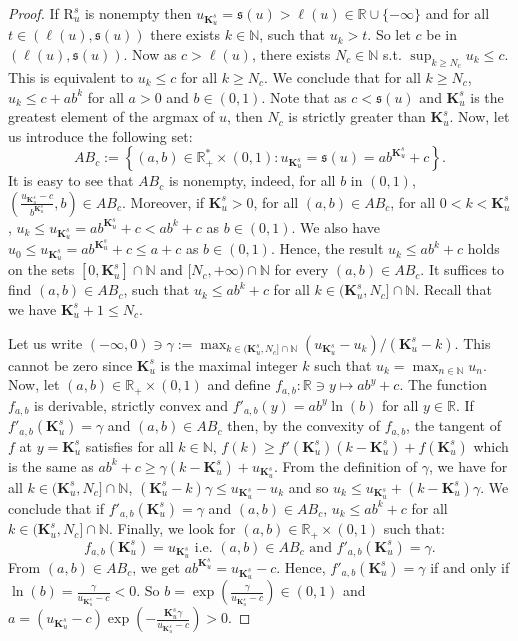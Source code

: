\documentclass{article}
\def\valu#1{\mathfrak{s}(#1)}
\def\ls#1{\boldsymbol{\ell}(#1)}
\def\rr{\mathbb R}
\def\nn{\mathbb N}
\def\bigks{\mathbf{K}^s}
\def\gls#1{{\mathrm R}_{#1}}
\def\gsls#1{\gls{#1}^s}
\def\red#1{#1}
\begin{document}
	\begin{proof}
		If $\gsls{u}$ is nonempty then $u_{\bigks_u}=\valu{u}>\ls{u}\in\rr\cup\{-\infty\}$ and for all $t\in (\ls{u},\valu{u})$ there exists 
		$k\in\nn$, such that $u_k>t$. So let $c$ be in $(\ls{u},\valu{u})$. Now as $c>\ls{u}$, there exists $N_c\in\nn$ s.t. $\sup_{k\geq N_c} u_k\leq c$. This is equivalent to $u_k\leq c$ for all $k\geq N_c$. We conclude that for all $k\geq N_c$, $u_k\leq c+ab^k$ for all $a>0$ and $b\in (0,1)$. Note that as $c<\valu{u}$ and $\bigks_u$ is the greatest element of the argmax of $u$, then $N_c$ is strictly greater than $\bigks_u$. Now, let us introduce the following set: 
		\[
		{AB}_c:= \left\{(a,b)\in\rr_+^* \times (0,1): u_{\bigks_u}=\valu{u}=a b^{\bigks_u}+c\right\}.
		\] 
		It is easy to see that ${AB}_c$ is nonempty, indeed, for all $b$ in $(0,1)$, $(\frac{u_{\bigks_u}-c}{b^{\bigks_u}},b)\in {AB}_c$. Moreover, if $\bigks_u>0$, for all $(a,b)\in {AB}_c$,
		for all $0<k< \bigks_u$, $u_k\leq u_{\bigks_u}=a b^{\bigks_u}+c<a b^k+c$ as $b\in (0,1)$. We also have $u_0\leq u_{\bigks_u}=ab^{\bigks_u}+c\leq a+c$ as $b\in (0,1)$. Hence, the result $u_k\leq ab^k+c$ holds on the sets $[0,\bigks_u]\cap \nn$ and $[N_c,+\infty)\cap\nn$ for every $(a,b)\in {AB}_c$. It suffices to find $(a,b)\in {AB}_c$, such that $u_k\leq ab^k+c$ for all $k\in (\bigks_u,N_c]\cap \nn$. Recall that we have $\bigks_u+1\leq N_c$.
		
		Let us write $(-\infty,0)\ni\gamma:=\max_{k\in (\bigks_u,N_c]\cap\nn} (u_{\bigks_u}-u_k)/(\bigks_u-k)$. This cannot be zero since $\bigks_u$ is the maximal integer $k$ such that $u_k=\max_{n\in\nn} u_n$. Now, let $(a,b)\in \rr_+\times (0,1)$ and define $f_{a,b}:\rr\ni y\mapsto a b^y+c$. The function $f_{a,b}$ is derivable, strictly convex and $f'_{a,b}(y)=ab^y\ln(b)$ for all $y\in\rr$. If $f'_{a,b}(\bigks_u)=\gamma$ and $(a,b)\in {AB}_c$ then, by the convexity of $f_{a,b}$, the tangent of $f$ at $y=\bigks_u$ satisfies for all $k\in\nn$, $f(k)\geq f'(\bigks_u)(k-\bigks_u)+f(\bigks_u)$ which is the same as $ab^k+c\geq \gamma (k-\bigks_u)+u_{\bigks_u}$. \red{From the} definition of $\gamma$, we have for all $k\in (\bigks_u,N_c\red{]\cap \nn}$, $(\bigks_u-k)\gamma\leq u_{\bigks_u}-u_k$ and so $u_k\leq u_{\bigks_u}+(k-\bigks_u)\gamma$. We conclude that if $f'_{a,b}(\bigks_u)=\gamma$ and $(a,b)\in {AB}_c$, $u_k\leq ab^k+c$ for all $k\in (\bigks_u,N_c]\red{\cap\nn}$. Finally, we look for $(a,b)\in \rr_+\times (0,1)$ such that:
		\[
		f_{a,b}(\bigks_u)=u_{\bigks_u} \text{ i.e. } (a,b)\in {AB}_c\text{ and } f'_{a,b}(\bigks_u)=\gamma.
		\]
		From $(a,b)\in {AB}_c$, we get $ab^{\bigks_u}=u_{\bigks_u}-c$. Hence, $f'_{a,b}(\bigks_u)=\gamma$ if and only if $\ln(b)=\frac{\gamma}{u_{\bigks_u}-c}<0$. So $b=\exp(\frac{\gamma}{u_{\bigks_u}-c})\in (0,1)$ and $a=(u_{\bigks_u}-c)\exp(-\frac{\bigks_u\gamma}{u_{\bigks_u}-c})>0$.
	\end{proof}
	
\end{document}
